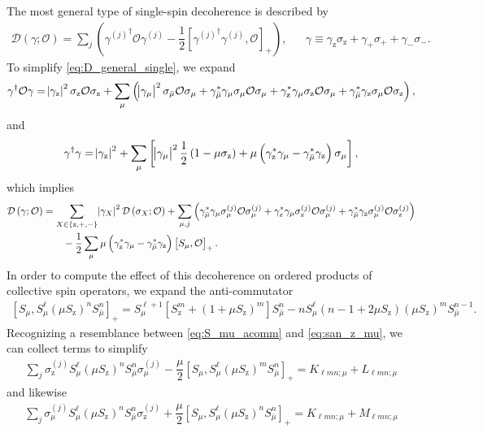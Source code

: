 \documentclass[aps,notitlepage,nofootinbib,11pt]{revtex4-1}
\newcommand{\f}[2]{\dfrac{#1}{#2}} %
\newcommand{\p}[1]{\left(#1\right)} %
\renewcommand{\sp}[1]{\left[#1\right]} %
\renewcommand{\set}[1]{\left\{#1\right\}} %
\newcommand{\D}{\mathcal{D}}
\renewcommand{\O}{\mathcal{O}}
\newcommand{\z}{\text{z}}
\newcommand{\bmu}{{\bar\mu}}
\newcommand{\1}{\mathds{1}}
\begin{document}
The most general type of single-spin decoherence is described by
\begin{align}
  \D\p{\gamma;\O}
  = \sum_j\p{{\gamma^{(j)}}^\dag \O \gamma^{(j)}
    - \f12\sp{{\gamma^{(j)}}^\dag \gamma^{(j)}, \O}_+},
  &&
  \gamma \equiv \gamma_\z \sigma_\z
  + \gamma_+ \sigma_+ + \gamma_- \sigma_-.
  \label{eq:D_general_single}
\end{align}
To simplify \eqref{eq:D_general_single}, we expand
\begin{align}
  \gamma^\dag \O \gamma
  = \abs{\gamma_\z}^2 \sigma_\z \O \sigma_\z
  + \sum_\mu \p{\abs{\gamma_\mu}^2 \sigma_\bmu \O \sigma_\mu
    + \gamma_\bmu^* \gamma_\mu \sigma_\mu \O \sigma_\mu
    + \gamma_\z^* \gamma_\mu \sigma_\z \O \sigma_\mu
    + \gamma_\bmu^* \gamma_\z \sigma_\mu \O \sigma_\z},
\end{align}
and
\begin{align}
  \gamma^\dag \gamma
  = \abs{\gamma_\z}^2
  + \sum_\mu \sp{\abs{\gamma_\mu}^2 \f12 \p{1-\mu\sigma_\z}
    + \mu \p{\gamma_\z^*\gamma_\mu - \gamma_\bmu^*\gamma_\z}
    \sigma_\mu},
\end{align}
which implies
\begin{align}
  \D\p{\gamma;\O}
  &= \sum_{X\in\set{\z,+,-}} \abs{\gamma_X}^2 \D\p{\sigma_X;\O}
  + \sum_{\mu,j}
  \p{\gamma_\bmu^* \gamma_\mu \sigma_\mu^{(j)} \O \sigma_\mu^{(j)}
    + \gamma_\z^* \gamma_\mu \sigma_\z^{(j)} \O \sigma_\mu^{(j)}
    + \gamma_\bmu^* \gamma_\z \sigma_\mu^{(j)} \O \sigma_\z^{(j)}}
  \notag \\
  &\qquad -\f12 \sum_\mu \mu
  \p{\gamma_\z^*\gamma_\mu - \gamma_\bmu^*\gamma_\z} \sp{S_\mu, \O}_+.
\end{align}
In order to compute the effect of this decoherence on ordered products
of collective spin operators, we expand the anti-commutator
\begin{align}
  \sp{S_\mu, S_\mu^\ell \p{\mu S_\z}^n S_\bmu^n}_+
  = S_\mu^{\ell+1} \sp{S_\z^m+\p{1+\mu S_\z}^m} S_\bmu^n
  - n S_\mu^\ell \p{n-1+2\mu S_\z} \p{\mu S_\z}^m S_\bmu^{n-1}.
  \label{eq:S_mu_acomm}
\end{align}
Recognizing a resemblance between \eqref{eq:S_mu_acomm} and
\eqref{eq:san_z_mu}, we can collect terms to simplify
\begin{align}
  \sum_j \sigma_\z^{(j)} S_\mu^\ell
  \p{\mu S_\z}^n S_\bmu^n \sigma_\mu^{(j)}
  - \f{\mu}{2} \sp{S_\mu, S_\mu^\ell \p{\mu S_\z}^m S_\bmu^n}_+
  = K_{\ell mn;\mu} + L_{\ell mn;\mu}
  \label{eq:dec_z_mu}
\end{align}
and likewise
\begin{align}
  \sum_j \sigma_\mu^{(j)} S_\mu^\ell
  \p{\mu S_\z}^n S_\bmu^n \sigma_\z^{(j)}
  + \f{\mu}{2} \sp{S_\mu, S_\mu^\ell \p{\mu S_\z}^n S_\bmu^n}_+
  = K_{\ell mn;\mu} + M_{\ell mn;\mu}
  \label{eq:dec_mu_z}
\end{align}
\end{document}
